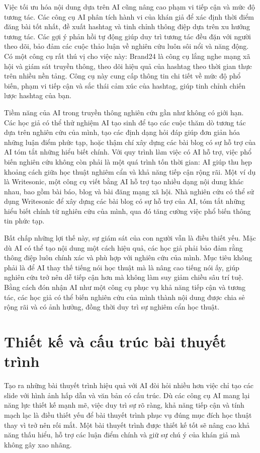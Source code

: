 Việc tối ưu hóa nội dung dựa trên AI cũng nâng cao phạm vi tiếp cận và mức độ tương tác. Các công cụ AI phân tích hành vi của khán giả để xác định thời điểm đăng bài tốt nhất, đề xuất hashtag và tinh chỉnh thông điệp dựa trên xu hướng tương tác. Các gợi ý phản hồi tự động giúp duy trì tương tác đều đặn với người theo dõi, bảo đảm các cuộc thảo luận về nghiên cứu luôn sôi nổi và năng động. Có một công cụ rất thú vị cho việc này: Brand24 là công cụ lắng nghe mạng xã hội và giám sát truyền thông, theo dõi hiệu quả của hashtag theo thời gian thực trên nhiều nền tảng. Công cụ này cung cấp thông tin chi tiết về mức độ phổ biến, phạm vi tiếp cận và sắc thái cảm xúc của hashtag, giúp tinh chỉnh chiến lược hashtag của bạn.

Tiềm năng của AI trong truyền thông nghiên cứu gần như không có giới hạn. Các học giả có thể thử nghiệm AI tạo sinh để tạo các cuộc thăm dò tương tác dựa trên nghiên cứu của mình, tạo các định dạng hỏi đáp giúp đơn giản hóa những luận điểm phức tạp, hoặc thậm chí xây dựng các bài blog có sự hỗ trợ của AI tóm tắt những hiểu biết chính. Với quy trình làm việc có AI hỗ trợ, việc phổ biến nghiên cứu không còn phải là một quá trình tốn thời gian: AI giúp thu hẹp khoảng cách giữa học thuật nghiêm cẩn và khả năng tiếp cận rộng rãi. Một ví dụ là Writesonic, một công cụ viết bằng AI hỗ trợ tạo nhiều dạng nội dung khác nhau, bao gồm bài báo, blog và bài đăng mạng xã hội. Nhà nghiên cứu có thể sử dụng Writesonic để xây dựng các bài blog có sự hỗ trợ của AI, tóm tắt những hiểu biết chính từ nghiên cứu của mình, qua đó tăng cường việc phổ biến thông tin phức tạp.

Bất chấp những lợi thế này, sự giám sát của con người vẫn là điều thiết yếu. Mặc dù AI có thể tạo nội dung một cách hiệu quả, các học giả phải bảo đảm rằng thông điệp luôn chính xác và phù hợp với nghiên cứu của mình. Mục tiêu không phải là để AI thay thế tiếng nói học thuật mà là nâng cao tiếng nói ấy, giúp nghiên cứu trở nên dễ tiếp cận hơn mà không làm suy giảm chiều sâu trí tuệ. Bằng cách đón nhận AI như một công cụ phục vụ khả năng tiếp cận và tương tác, các học giả có thể biến nghiên cứu của mình thành nội dung được chia sẻ rộng rãi và có ảnh hưởng, đồng thời duy trì sự nghiêm cẩn học thuật.

\section{Thiết kế và cấu trúc bài thuyết trình}

Tạo ra những bài thuyết trình hiệu quả với AI đòi hỏi nhiều hơn việc chỉ tạo các slide với hình ảnh hấp dẫn và văn bản có cấu trúc. Dù các công cụ AI mang lại năng lực thiết kế mạnh mẽ, việc duy trì sự rõ ràng, khả năng tiếp cận và tính mạch lạc là điều thiết yếu để bài thuyết trình phục vụ đúng mục đích học thuật thay vì trở nên rối mắt. Một bài thuyết trình được thiết kế tốt sẽ nâng cao khả năng thấu hiểu, hỗ trợ các luận điểm chính và giữ sự chú ý của khán giả mà không gây xao nhãng.

